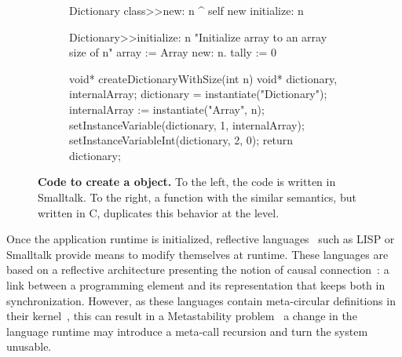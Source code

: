 \begin{figure}[ht]
\begin{subfigure}{.5\linewidth}
\begin{code}
Dictionary class>>new: n
    ^ self new initialize: n

Dictionary>>initialize: n
    "Initialize array to an array size of n"
    array := Array new: n.
    tally := 0
\end{code}
\end{subfigure}
\begin{subfigure}{.5\linewidth}
\begin{code}
void* createDictionaryWithSize(int n){
    void* dictionary, internalArray;
    dictionary = instantiate("Dictionary");
    internalArray := instantiate("Array", n);
    setInstanceVariable(dictionary, 1, internalArray);
    setInstanceVariableInt(dictionary, 2, 0);
    return dictionary;
}
\end{code}
\end{subfigure}
\caption{\textbf{Code to create a  object.} To the left, the code is written in Smalltalk. To the right, a function with the similar semantics, but written in C, duplicates this behavior at the \VM level.\label{code:logic_dup}}
\end{figure}



Once the application runtime is initialized, reflective languages~\cite{Smit84a} such as LISP or Smalltalk provide means to modify themselves at runtime. These languages are based on a reflective architecture presenting the notion of causal connection~\cite{Maes87a}: a link between a programming element and its representation that keeps both in synchronization. However, as these languages contain meta-circular definitions in their kernel~\cite{Chib96a}, this can result in a Metastability problem~\cite{Kicz91a} \ie a change in the language runtime may introduce a meta-call recursion and turn the system unusable.%

